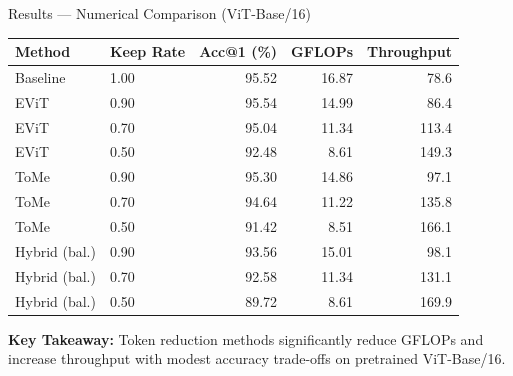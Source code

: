 \documentclass[aspectratio=169, 11pt]{beamer}
\begin{document}
\begin{frame}{Results — Numerical Comparison (ViT-Base/16)}
\begin{table}[h]
\centering
\small
\begin{tabular}{@{}llrrr@{}}
\toprule
\textbf{Method} & \textbf{Keep Rate} & \textbf{Acc@1 (\%)} & \textbf{GFLOPs} & \textbf{Throughput} \\
\midrule
Baseline        & 1.00 & 95.52 & 16.87 & 78.6 \\
\midrule
EViT            & 0.90 & 95.54 & 14.99 & 86.4 \\
EViT            & 0.70 & 95.04 & 11.34 & 113.4 \\
EViT            & 0.50 & 92.48 &  8.61 & 149.3 \\
\midrule
ToMe            & 0.90 & 95.30 & 14.86 & 97.1 \\
ToMe            & 0.70 & 94.64 & 11.22 & 135.8 \\
ToMe            & 0.50 & 91.42 &  8.51 & 166.1 \\
\midrule
Hybrid (bal.)   & 0.90 & 93.56 & 15.01 & 98.1 \\
Hybrid (bal.)   & 0.70 & 92.58 & 11.34 & 131.1 \\
Hybrid (bal.)   & 0.50 & 89.72 &  8.61 & 169.9 \\
\bottomrule
\end{tabular}
\end{table}
\vspace{0.2cm}
\textbf{Key Takeaway:} Token reduction methods significantly reduce GFLOPs and increase throughput with modest accuracy trade-offs on pretrained ViT-Base/16.
\end{frame}
\end{document}
